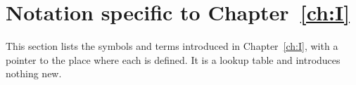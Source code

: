 \begingroup
\providecommand{\ov}{}\renewcommand{\ov}[1]{\overline{#1}}
\providecommand{\eps}{}\renewcommand{\eps}{\epsilon}
\providecommand{\A}{}\renewcommand{\A}{\mathbb{A}}
\providecommand{\C}{}\renewcommand{\C}{\mathbb{C}}
\providecommand{\Q}{}\renewcommand{\Q}{\mathbb{Q}}
\providecommand{\Z}{}\renewcommand{\Z}{\mathbb{Z}}
\providecommand{\cO}{}\renewcommand{\cO}{\mathcal{O}}
\providecommand{\gen}{}\renewcommand{\gen}{\mathrm{gen}}
\providecommand{\reg}{}\renewcommand{\reg}{\mathrm{reg}}
\providecommand{\tr}{}\renewcommand{\tr}{\operatorname{tr}}
\providecommand{\Gal}{}\renewcommand{\Gal}{\operatorname{Gal}}
\providecommand{\Aut}{}\renewcommand{\Aut}{\operatorname{Aut}}
\providecommand{\Nrd}{}\renewcommand{\Nrd}{\operatorname{Nrd}}
\providecommand{\Ad}{}\renewcommand{\Ad}{\operatorname{Ad}}
\providecommand{\Hom}{}\renewcommand{\Hom}{\operatorname{Hom}}
\providecommand{\Iso}{}\renewcommand{\Iso}{\operatorname{Iso}}
\providecommand{\vol}{}\renewcommand{\vol}{\operatorname{vol}}
\providecommand{\supp}{}\renewcommand{\supp}{\operatorname{supp}}
\providecommand{\diag}{}\renewcommand{\diag}{\operatorname{diag}}
\providecommand{\GL}{}\renewcommand{\GL}{\mathrm{GL}}
\providecommand{\SL}{}\renewcommand{\SL}{\mathrm{SL}}
\providecommand{\Gb}{}\renewcommand{\Gb}{\ov{G}}
\providecommand{\Zb}{}\renewcommand{\Zb}{\ov{Z}}
\providecommand{\GDb}{}\renewcommand{\GDb}{\ov{G}_D}
\providecommand{\pib}{}\renewcommand{\pib}{\ov{\pi}}
\providecommand{\ks}{}\renewcommand{\ks}{\kappa^{*}}
\providecommand{\Eb}{}\renewcommand{\Eb}{\ov{E}}
\providecommand{\Tb}{}\renewcommand{\Tb}{\ov{T}}
\providecommand{\cG}{}\renewcommand{\cG}{\mathcal{G}}
\providecommand{\cGb}{}\renewcommand{\cGb}{\ov{\mathcal{G}}}
\providecommand{\iD}{}\renewcommand{\iD}{\iota_D}
\providecommand{\iG}{}\renewcommand{\iG}{\iota_{\GL}}
\providecommand{\jj}{}\renewcommand{\jj}{\jmath}
\providecommand{\Pv}{}\renewcommand{\Pv}{\textbf{(P)}}
\providecommand{\Ev}{}\renewcommand{\Ev}{\textbf{(E)}}
\providecommand{\Ov}{}\renewcommand{\Ov}{\textbf{(O)}}
\providecommand{\Cv}{}\renewcommand{\Cv}{\textbf{(C)}}
\section{Notation specific to \texorpdfstring{Chapter~\ref{ch:I}}{Chapter 4}}\label{I:subsec:glossI}
This section lists the symbols and terms introduced in Chapter~\ref{ch:I}, with a pointer to the place where each is defined. It is a lookup table and introduces nothing new.

